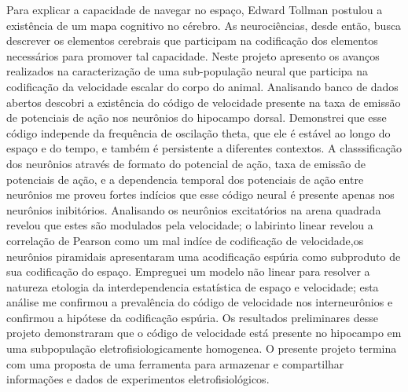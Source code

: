 %
%



Para explicar a capacidade de navegar no espaço, Edward Tollman postulou a existência de um mapa cognitivo no cérebro.
As neurociências, desde então, busca descrever os elementos cerebrais que participam na codificação dos elementos necessários para promover tal capacidade.
Neste projeto apresento os avanços realizados na caracterização de uma sub-população neural que participa na codificação da velocidade escalar do corpo do animal.
Analisando banco de dados abertos descobri a existência do código de velocidade presente na taxa de emissão de potenciais de ação nos neurônios do hipocampo dorsal.
Demonstrei que esse código independe da frequência de oscilação theta, que ele é estável ao longo do espaço e do tempo, e também é persistente a diferentes contextos.
A classsificação dos neurônios através de formato do potencial de ação, taxa de emissão de potenciais de ação, e a dependencia temporal dos potenciais de ação entre neurônios me proveu fortes indícios que esse código neural é presente apenas nos neurônios inibitórios.
Analisando os neurônios excitatórios na arena quadrada revelou que estes são modulados pela velocidade; o labirinto linear revelou a correlação de Pearson como um mal indíce de codificação de velocidade,os neurônios piramidais apresentaram uma acodificação espúria como subproduto de sua codificação do espaço.
Empreguei um modelo não linear para resolver a natureza etologia da interdependencia estatística de espaço e velocidade; esta análise me confirmou a prevalência do código de velocidade nos interneurônios e confirmou a hipótese da codificação espúria.
Os resultados preliminares desse projeto demonstraram que o código de velocidade está presente no hipocampo em uma subpopulação eletrofisiologicamente homogenea.
O presente projeto termina com uma proposta de uma ferramenta para armazenar e compartilhar informações e dados de experimentos eletrofisiológicos.

